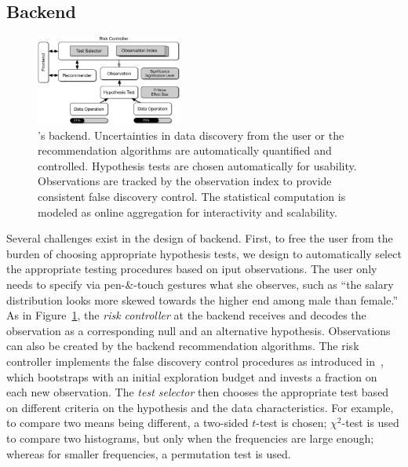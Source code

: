 \subsection{Backend}
\label{sec:backend}

\begin{figure}[!ht]
\centering
\includegraphics[width=0.43\textwidth]{figures/risk-controller.pdf}
\caption{\system{}'s backend. Uncertainties in data discovery from the user or the recommendation algorithms are automatically quantified and controlled.  Hypothesis tests are chosen automatically for usability.  Observations are tracked by the observation index to provide consistent false discovery control. The statistical computation is modeled as online aggregation for interactivity and scalability.}
\label{fig:backend}	
\vspace{-0.5ex}
\end{figure}

Several challenges exist in the design of \system{} backend.  First, to free the user from the burden of choosing appropriate hypothesis tests, we design \system{} to automatically select the appropriate testing procedures based on iput observations. The user only needs to specify via pen-\&-touch gestures what she observes, such as ``the salary distribution looks more skewed towards the higher end among male than female.''  As in Figure~\ref{fig:backend}, the \textit{risk controller} at the backend receives and decodes the observation as a corresponding null and an alternative hypothesis. Observations can also be created by the backend recommendation algorithms.  The risk controller implements the false discovery control procedures as introduced in~\cite{zhao2016controlling}, which bootstraps with an initial exploration budget and invests a fraction on each new observation.  The \textit{test selector} then chooses the appropriate test based on different criteria on the hypothesis and the data characteristics.  For example, to compare two means being different, a two-sided $t$-test is chosen; $\chi^2$-test is used to compare two histograms, but only when the frequencies are large enough; whereas for smaller frequencies, a permutation test is used. 

